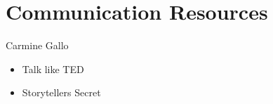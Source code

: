 \documentclass[
]{book}
\providecommand{\tightlist}{%
  \setlength{\itemsep}{0pt}\setlength{\parskip}{0pt}}
\begin{document}
\hypertarget{communication-resources}{%
\chapter{Communication Resources}\label{communication-resources}}

Carmine Gallo

\begin{itemize}
\tightlist
\item
  Talk like TED
\item
  Storytellers Secret
\end{itemize}
\end{document}
